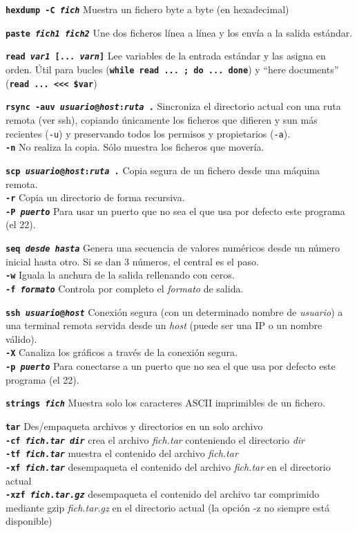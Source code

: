 \documentclass[10pt,landscape,a4paper]{article}
\newcommand{\code}{\texttt}
\newcommand{\bcode}[1]{\texttt{\textbf{#1}}}
\begin{document}
\begin{multicols}{3}
\bcode{hexdump -C \emph{fich}} Muestra un fichero byte a byte (en hexadecimal)

\bcode{paste \emph{fich1} \emph{fich2}} Une dos ficheros línea a línea y los envía a la salida estándar.

\bcode{read \emph{var1} [... \emph{varn}]} Lee variables de la entrada estándar y las asigna en orden. Útil para bucles (\bcode{while read ... ; do ... done}) y ``here documents'' (\bcode{read ... <<< \${var}})

\bcode{rsync -auv \emph{usuario}@\emph{host}:\emph{ruta} .} Sincroniza el directorio actual con una ruta remota (ver ssh), copiando únicamente los ficheros que difieren y sun más recientes (\code{-u}) y preservando todos los permisos y propietarios (\code{-a}).\\
  \bcode{-n} No realiza la copia. Sólo muestra los ficheros que movería.

\bcode{scp \emph{usuario}@\emph{host}:\emph{ruta} .} Copia segura de un fichero  desde una máquina remota.\\
  \bcode{-r} Copia un directorio de forma recursiva.\\
  \bcode{-P \emph{puerto}} Para usar un puerto que no sea el que usa por defecto este programa (el 22).

\bcode{seq \emph{desde} \emph{hasta}} Genera una secuencia de valores numéricos desde un número inicial hasta otro. Si se dan 3 números, el central es el paso.\\
  \bcode{-w} Iguala la anchura de la salida rellenando con ceros.\\
  \bcode{-f \emph{formato}} Controla por completo el \emph{formato} de salida.

\bcode{ssh \emph{usuario}@\emph{host}} Conexión segura (con un determinado nombre de \emph{usuario}) a una terminal remota servida desde un \emph{host} (puede ser una IP o un nombre válido).\\
  \bcode{-X} Canaliza los gráficos a través de la conexión segura.\\
  \bcode{-p \emph{puerto}} Para conectarse a un puerto que no sea el que usa por defecto este programa (el 22).

\bcode{strings \emph{fich}} Muestra solo los caracteres ASCII imprimibles de un fichero.

\bcode{tar} Des/empaqueta archivos y directorios en un solo archivo\\
  \bcode{-cf \emph{fich.tar dir}} crea el archivo \emph{fich.tar} conteniendo el directorio \emph{dir}\\
  \bcode{-tf \emph{fich.tar}} muestra el contenido del archivo \emph{fich.tar}\\
  \bcode{-xf \emph{fich.tar}} desempaqueta el contenido del archivo \emph{fich.tar} en el directorio actual\\
  \bcode{-xzf \emph{fich.tar.gz}} desempaqueta el contenido del archivo tar comprimido mediante gzip \emph{fich.tar.gz} en el directorio actual (la opción -z no siempre está disponible)


\end{multicols}
\end{document}
